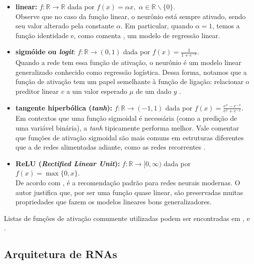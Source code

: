 \documentclass{automatextcc}
\newcommand{\R}{\mathds{R}}
\begin{document}
\begin{itemize}
    \item \textbf{linear:} $f: \R \rightarrow \R$ dada por $f(x) = \alpha x,$  $\alpha \in \R\backslash\{0\}$. \\
    Observe que no caso da função linear, o neurônio está sempre ativado, sendo seu valor alterado pela constante $\alpha$. Em particular, quando $\alpha=1$, temos a função identidade e, como comenta \citet{sarle1994}, um modelo de regressão linear.
    \item \textbf{sigmóide ou \textit{logit}}: $f: \R \rightarrow (0,1)$ dada por $f(x) = \frac{1}{1 + e^{-x}}$. \\
    Quando a rede tem essa função de ativação, o neurônio é um modelo linear generalizado conhecido como regressão logística. Dessa forma, notamos que a função de ativação tem um papel semelhante à função de ligação: relacionar o preditor linear $v$ a um valor esperado $\mu$ de um dado $y$ \citep{sarle1994,frei2020,mccullagh1989}. %
    \item \textbf{tangente hiperbólica (\textit{tanh}):}  $f:\R \rightarrow (-1,1)$ dada por $f(x) = \frac{e^{x}-e^{-x}}{e^{x}+e^{-x}}$. \\
    Em contextos que uma função sigmoidal é necessária (como a predição de uma variável binária), a \textit{tanh} tipicamente performa melhor. Vale comentar que funções de ativação sigmoidal são mais comuns em estruturas diferentes que a de redes alimentadas adiante, como as redes recorrentes \citep{goodfellow2016}.  
    \item \textbf{ReLU (\textit{Rectified Linear Unit}):} $f: \R \rightarrow [0,\infty)$ dada por $f(x) = \max\{0,x\}$. \\
    De acordo com \citet{goodfellow2016}, é a recomendação padrão para redes neurais modernas. O autor justifica que, por ser uma função quase linear, são preservadas muitas propriedades que fazem os modelos lineares bons generalizadores. %
\end{itemize}
Listas de funções de ativação comumente utilizadas podem ser encontradas em \citet{hagan2014}, \citet{aggarwal2018} e \citet{dsa2022}.


\subsection{Arquitetura de RNAs}
\end{document}
